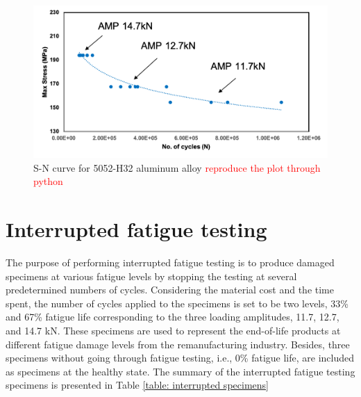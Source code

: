 \begin{figure}[tb]
  \includegraphics[width=0.9\linewidth]{fig/sn_curve.png}
  \caption{S-N curve for 5052-H32 aluminum alloy \textcolor{red}{reproduce the plot through python}}
  \label{fig: raw sn curve}
\end{figure}

\section{Interrupted fatigue testing}
The purpose of performing interrupted fatigue testing is to produce damaged specimens at various fatigue levels by stopping the testing at several predetermined numbers of cycles. Considering the material cost and the time spent, the number of cycles applied to the specimens is set to be two levels, 33\% and 67\% fatigue life corresponding to the three loading amplitudes, 11.7, 12.7, and 14.7 kN. These specimens are used to represent the end-of-life products at different fatigue damage levels from the remanufacturing industry. Besides, three specimens without going through fatigue testing, i.e., 0\% fatigue life, are included as specimens at the healthy state. The summary of the interrupted fatigue testing specimens is presented in Table \ref{table: interrupted specimens}

